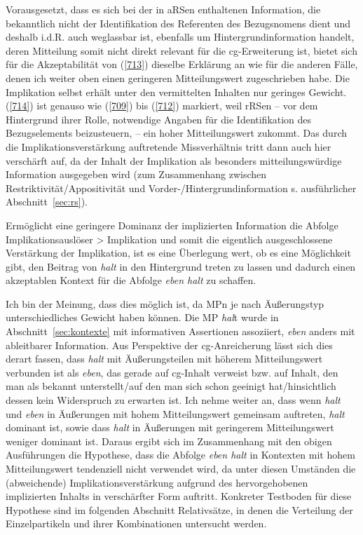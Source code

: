 Vorausgesetzt, dass es sich bei der in aRSen enthaltenen Information, die be\-kanntlich nicht der Identifikation des Referenten des Bezugsnomens dient und des\-halb i.d.R. auch weglassbar ist, ebenfalls um Hintergrundinformation handelt, deren Mitteilung somit nicht direkt relevant für die cg-Erweiterung ist, bietet sich für die Akzeptabilität von (\ref{713}) dieselbe Erklärung an wie für die anderen Fälle, denen ich weiter oben einen geringeren Mitteilungswert zugeschrieben habe. Die Implikation selbst erhält unter den vermittelten Inhalten nur geringes Gewicht. (\ref{714}) ist genauso wie (\ref{709}) bis (\ref{712}) markiert, weil rRSen – vor dem Hintergrund ihrer Rolle, notwendige Angaben für die Identifikation des Bezugselements beizusteuern, – ein hoher Mitteilungswert zukommt. Das durch die Implikationsverstärkung auftretende Missverhältnis tritt dann auch hier verschärft auf, da der Inhalt der Implikation als besonders mitteilungswürdige Information ausgegeben wird (zum Zusammenhang zwischen Restriktivität/Appositivität und Vorder-/Hintergrundinformation s. ausführlicher Abschnitt~\ref{sec:rs}).

Ermöglicht eine geringere Dominanz der implizierten Information die Abfolge Implikationsauslöser > Implikation und somit die eigentlich ausgeschlossene Verstärkung der Implikation, ist es eine Überlegung wert, ob es eine Möglichkeit gibt, den Beitrag von \textit{halt} in den Hintergrund treten zu lassen und dadurch einen akzeptablen Kontext für die Abfolge \textit{eben halt} zu schaffen.

Ich bin der Meinung, dass dies möglich ist, da MPn je nach Äußerungstyp unterschiedliches Gewicht haben können. Die MP \textit{hal}t wurde in Abschnitt~\ref{sec:kontexte} mit informativen Assertionen assoziiert, \textit{eben} anders mit ableitbarer Information. Aus Perspektive der cg-Anreicherung lässt sich dies derart fassen, dass \textit{halt} mit Äußerungsteilen mit höherem Mitteilungswert verbunden ist als \textit{eben}, das gerade auf cg-Inhalt verweist bzw. auf Inhalt, den man als bekannt unterstellt/auf den man sich schon geeinigt hat/hinsichtlich dessen kein Widerspruch zu erwarten ist. Ich nehme weiter an, dass wenn \textit{halt} und \textit{eben} in Äußerungen mit hohem Mitteilungswert gemeinsam auftreten, \textit{halt} dominant ist, sowie dass \textit{halt} in Äußerungen mit geringerem Mitteilungswert weniger dominant ist. Daraus ergibt sich im Zusammenhang mit den obigen Ausführungen die Hypothese, dass die Abfolge \textit{eben halt} in Kontexten mit hohem Mitteilungswert tendenziell nicht verwendet wird, da unter diesen Umständen die (abweichende) Implikationsverstärkung aufgrund des hervorgehobenen implizierten Inhalts in verschärfter Form auftritt. Konkreter Testboden für diese Hypothese sind im folgenden Abschnitt Relativsätze, in denen die Verteilung der Einzelpartikeln und ihrer Kombinationen untersucht werden.

